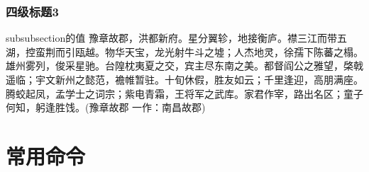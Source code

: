 \subsubsection{四级标题3}
subsubsection的值
豫章故郡，洪都新府。星分翼轸，地接衡庐。襟三江而带五湖，控蛮荆而引瓯越。物华天宝，龙光射牛斗之墟；人杰地灵，徐孺下陈蕃之榻。雄州雾列，俊采星驰。台隍枕夷夏之交，宾主尽东南之美。都督阎公之雅望，棨戟遥临；宇文新州之懿范，襜帷暂驻。十旬休假，胜友如云；千里逢迎，高朋满座。腾蛟起凤，孟学士之词宗；紫电青霜，王将军之武库。家君作宰，路出名区；童子何知，躬逢胜饯。(豫章故郡 一作：南昌故郡)
\section{常用命令}